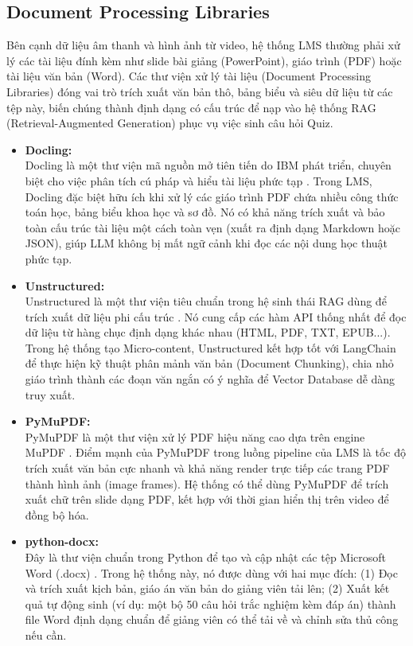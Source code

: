 \subsection{Document Processing Libraries}
Bên cạnh dữ liệu âm thanh và hình ảnh từ video, hệ thống LMS thường phải xử lý các tài liệu đính kèm như slide bài giảng (PowerPoint), giáo trình (PDF) hoặc tài liệu văn bản (Word). Các thư viện xử lý tài liệu (Document Processing Libraries) đóng vai trò trích xuất văn bản thô, bảng biểu và siêu dữ liệu từ các tệp này, biến chúng thành định dạng có cấu trúc để nạp vào hệ thống RAG (Retrieval-Augmented Generation) phục vụ việc sinh câu hỏi Quiz.

\begin{itemize}
    \item[\textbf{a.}] \textbf{Docling:} \\
    Docling là một thư viện mã nguồn mở tiên tiến do IBM phát triển, chuyên biệt cho việc phân tích cú pháp và hiểu tài liệu phức tạp \cite{docling2024}. Trong LMS, Docling đặc biệt hữu ích khi xử lý các giáo trình PDF chứa nhiều công thức toán học, bảng biểu khoa học và sơ đồ. Nó có khả năng trích xuất và bảo toàn cấu trúc tài liệu một cách toàn vẹn (xuất ra định dạng Markdown hoặc JSON), giúp LLM không bị mất ngữ cảnh khi đọc các nội dung học thuật phức tạp.
    
    \item[\textbf{b.}] \textbf{Unstructured:} \\
    Unstructured là một thư viện tiêu chuẩn trong hệ sinh thái RAG dùng để trích xuất dữ liệu phi cấu trúc \cite{unstructured2024}. Nó cung cấp các hàm API thống nhất để đọc dữ liệu từ hàng chục định dạng khác nhau (HTML, PDF, TXT, EPUB...). Trong hệ thống tạo Micro-content, Unstructured kết hợp tốt với LangChain để thực hiện kỹ thuật phân mảnh văn bản (Document Chunking), chia nhỏ giáo trình thành các đoạn văn ngắn có ý nghĩa để Vector Database dễ dàng truy xuất.
    
    \item[\textbf{c.}] \textbf{PyMuPDF:} \\
    PyMuPDF là một thư viện xử lý PDF hiệu năng cao dựa trên engine MuPDF \cite{mckennon2024pymupdf}. Điểm mạnh của PyMuPDF trong luồng pipeline của LMS là tốc độ trích xuất văn bản cực nhanh và khả năng render trực tiếp các trang PDF thành hình ảnh (image frames). Hệ thống có thể dùng PyMuPDF để trích xuất chữ trên slide dạng PDF, kết hợp với thời gian hiển thị trên video để đồng bộ hóa.
    
    \item[\textbf{d.}] \textbf{python-docx:} \\
    Đây là thư viện chuẩn trong Python để tạo và cập nhật các tệp Microsoft Word (.docx) \cite{python_docx2024}. Trong hệ thống này, nó được dùng với hai mục đích: (1) Đọc và trích xuất kịch bản, giáo án văn bản do giảng viên tải lên; (2) Xuất kết quả tự động sinh (ví dụ: một bộ 50 câu hỏi trắc nghiệm kèm đáp án) thành file Word định dạng chuẩn để giảng viên có thể tải về và chỉnh sửa thủ công nếu cần.
    

\end{itemize}
